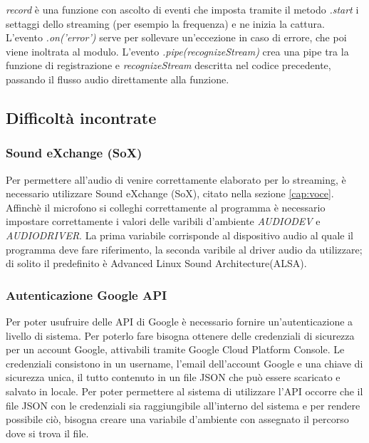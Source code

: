 \emph{record} \`e una funzione con ascolto di eventi che
imposta tramite il metodo \emph{.start} i settaggi dello streaming (per esempio la frequenza) e ne inizia la cattura.
L'evento \emph{.on('error')} serve per sollevare un'eccezione in caso di errore, che poi viene inoltrata al modulo.
L'evento \emph{.pipe(recognizeStream)} crea una pipe tra la funzione di registrazione e \emph{recognizeStream} descritta nel codice precedente,
passando il flusso audio direttamente alla funzione.

\subsection{Difficolt\`a incontrate}
\subsubsection{Sound eXchange (SoX)}\label{cap:sox}
Per permettere all'audio di venire correttamente elaborato
per lo streaming, \`e necessario utilizzare Sound eXchange (SoX), citato nella sezione \ref{cap:voce}.
Affinch\`e il microfono si colleghi correttamente al programma \`e necessario impostare correttamente
i valori delle varibili d'ambiente \textit{AUDIODEV} e \textit{AUDIODRIVER}.
La prima variabile corrisponde al dispositivo audio al quale il programma deve fare riferimento,
la seconda varibile al driver audio da utilizzare; di solito il predefinito \`e Advanced Linux Sound Architecture(ALSA).

\subsubsection{Autenticazione Google API}\label{cap:google}
Per poter usufruire delle API di Google \`e necessario fornire un'autenticazione a livello
di sistema.
Per poterlo fare bisogna ottenere delle credenziali di sicurezza per un account Google,
attivabili tramite Google Cloud Platform Console.
Le credenziali consistono in un username, l'email dell'account Google e una chiave di sicurezza unica,
 il tutto contenuto in un file JSON che pu\`o essere scaricato e salvato in locale.
Per poter permettere al sistema di utilizzare l'API occorre che il file JSON con le credenziali sia
raggiungibile all'interno del sistema e per rendere possibile ciò, bisogna creare una variabile d'ambiente con assegnato il percorso
dove si trova il file.

